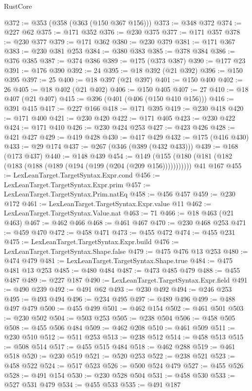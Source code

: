 \begin{lexlean}{RustCore}
\begin{coremodule}
@372 := @353 (@358 (@363 (@150 @367 @156)))
@373 := @348 @372
@374 := @227 @62
@375 := @171 @352
@376 := @230 @375
@377 := @171 @357
@378 := @230 @377
@379 := @171 @362
@380 := @230 @379
@381 := @171 @367
@383 := @230 @381 @253
@384 := @380 @383
@385 := @378 @384
@386 := @376 @385
@387 := @374 @386
@389 := @175 (@373 @387)
@390 := @177 @23
@391 := @176 @390
@392 := 24
@395 := @18 @392 (@21 @392)
@396 := @150 @395
@397 := 25
@400 := @18 @397 (@21 @397)
@401 := @150 @400
@402 := 26
@405 := @18 @402 (@21 @402)
@406 := @150 @405
@407 := 27
@410 := @18 @407 (@21 @407)
@415 := @396 (@401 (@406 (@150 @410 @156)))
@416 := @391 @415
@417 := @227 @166
@418 := @171 @395
@419 := @230 @418
@420 := @171 @400
@421 := @230 @420
@422 := @171 @405
@423 := @230 @422
@424 := @171 @410
@426 := @230 @424 @253
@427 := @423 @426
@428 := @421 @427
@429 := @419 @428
@430 := @417 @429
@432 := @175 (@416 @430)
@433 := @29 @174
@437 := @267 (@346 (@389 (@432 @433)))
@439 := @168 (@173 @437)
@440 := @148 @439
@454 := @149
    (@155 (@180 (@181 (@182 (@183 (@188 (@189 (@194 (@199 (@204 (@209 @156)))))))))))
    @41
    @167
@455 := LexLeanTarget.TargetSyntax.Expr.cond
@456 := LexLeanTarget.TargetSyntax.Expr.prim
@457 := LexLeanTarget.TargetSyntax.Prim.natEq
@458 := @456 @457
@459 := @230 @172
@461 := LexLeanTarget.TargetSyntax.Expr.value @11
@462 := LexLeanTarget.TargetSyntax.Value.nat
@463 := 71
@466 := @18 @463 (@21 @463)
@467 := @462 @466
@468 := @461 @467
@470 := @230 @468 @253
@471 := @459 @470
@472 := @458 @471
@473 := @455 @472
@474 := @455 @231
@475 := LexLeanTarget.TargetSyntax.Expr.build
@476 := LexLeanTarget.TargetSyntax.Shape.false
@479 := @475 @476 @13 @253
@480 := @474 @479
@481 := LexLeanTarget.TargetSyntax.Shape.true
@484 := @475 @481 @13 @253
@485 := @480 @484
@487 := @473 @485 @479
@488 := @455 @487
@489 := @227 @187
@490 := LexLeanTarget.TargetSyntax.Expr.field
@491 := @490 @239
@492 := @491 @62
@493 := @230 @492
@494 := @246 @253
@495 := @493 @494
@496 := @234 @495
@497 := @489 @496
@499 := @488 @497 @479
@500 := @455 @499
@501 := @462 @154
@502 := @461 @501
@503 := @230 @502
@504 := @503 @253
@505 := @238 @504
@506 := @458 @505
@508 := @455 @506 @484
@509 := @462 @208
@510 := @461 @509
@511 := @230 @510
@512 := @511 @253
@513 := @238 @512
@514 := @458 @513
@515 := @508 @514
@517 := @455 @515 @484
@518 := @462 @288
@519 := @461 @518
@520 := @230 @519
@521 := @520 @253
@522 := @238 @521
@523 := @458 @522
@524 := @517 @523
@526 := @500 @524 @479
@527 := @455 @526
@528 := @491 @154
@530 := @230 @528 @504
@531 := @458 @530
@533 := @527 @531 @479
@534 := @455 @533
@535 := @491 @187

\end{coremodule}
\end{lexlean}
